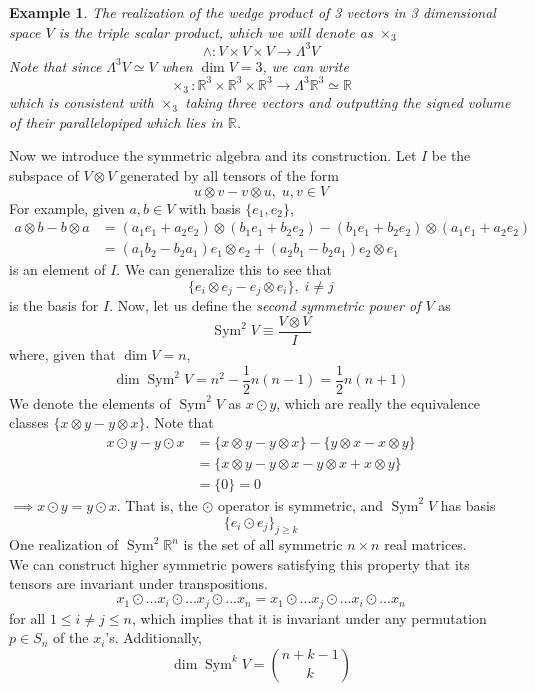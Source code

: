 \documentclass{article}
\DeclareMathOperator{\Sym}{Sym}
\newtheorem{example}{Example}[section]
\theoremstyle{remark}
\theoremstyle{definition}
\begin{document}
\begin{example}
The realization of the wedge product of 3 vectors in 3 dimensional space $V$ is the \textit{triple scalar product}, which we will denote as $\times_3$
\[\wedge: V \times V \times V \longrightarrow \Lambda^3 V\]
Note that since $\Lambda^3 V \simeq V$ when $\dim{V} = 3$, we can write 
\[\times_3: \mathbb{R}^3 \times \mathbb{R}^3 \times \mathbb{R}^3 \longrightarrow \Lambda^3 \mathbb{R}^3 \simeq \mathbb{R}\]
which is consistent with $\times_3$ taking three vectors and outputting the signed volume of their parallelopiped which lies in $\mathbb{R}$. 
\end{example}

Now we introduce the symmetric algebra and its construction. Let $I$ be the subspace of $V \otimes V$ generated by all tensors of the form 
\[u \otimes v - v \otimes u, \; u, v \in V\]
For example, given $a, b \in V$ with basis $\{e_1, e_2\}$, 
\begin{align*}
    a \otimes b - b \otimes a & = (a_1 e_1 + a_2 e_2) \otimes (b_1 e_1 + b_2 e_2) - (b_1 e_1 + b_2 e_2) \otimes (a_1 e_1 + a_2 e_2) \\
    & = (a_1 b_2 - b_2 a_1) e_1 \otimes e_2 + (a_2 b_1 - b_2 a_1) e_2 \otimes e_1 
\end{align*}
is an element of $I$. We can generalize this to see that
\[\{e_i \otimes e_j - e_j \otimes e_i\}, \; i \neq j\]
is the basis for $I$. Now, let us define the \textit{second symmetric power of $V$} as 
\[\Sym^2 V \equiv \frac{V \otimes V}{I}\]
where, given that $\dim{V} = n$, 
\[\dim{\Sym^2 V} = n^2 - \frac{1}{2} n (n-1) = \frac{1}{2} n (n+1)\]
We denote the elements of $\Sym^2 V$ as $x \odot y$, which are really the equivalence classes $\{x \otimes y - y \otimes x\}$. Note that
\begin{align*}
    x \odot y - y \odot x & = \{x \otimes y - y \otimes x\} - \{ y \otimes x - x \otimes y\} \\
    & = \{ x \otimes y - y \otimes x - y \otimes x + x \otimes y\} \\
    & = \{0\} = 0
\end{align*}
$\implies x \odot y = y \odot x$. That is, the $\odot$ operator is symmetric, and $\Sym^2 V$ has basis 
\[ \{e_i \odot e_j\}_{j \geq k}\]
One realization of $\Sym^2 \mathbb{R}^n$ is the set of all symmetric $n \times n$ real matrices. 
\\

We can construct higher symmetric powers satisfying this property that its tensors are invariant under transpositions. 
\[x_1 \odot ... x_i \odot ... x_j \odot ... x_n = x_1 \odot ... x_j \odot ... x_i \odot ... x_n\]
for all $1 \leq i \neq j \leq n$, which implies that it is invariant under any permutation $p \in S_n$ of the $x_i$'s. Additionally, 
\[\dim{\Sym^k V} = {{n+k-1} \choose k }\]
\end{document}
